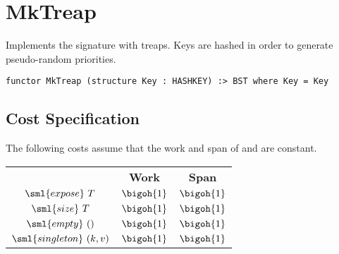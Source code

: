\chapter{MkTreap}
\label{ch:treap-bst}

\begin{cluster}
\label{grp:grm:treap-bst::implements}

\begin{gram}
\label{grm:treap-bst::implements}
\label{ch:treap-bst}
\begin{preamble}
Implements the  signature with treaps. Keys are hashed in order to
generate pseudo-random priorities.
\begin{verbatim}
functor MkTreap (structure Key : HASHKEY) :> BST where Key = Key
\end{verbatim}
\end{preamble}

\end{gram}
\end{cluster}


\section{Cost Specification}
\label{sec:treap-bst::cost-specification}

\begin{cluster}
\label{grp:grm:treap-bst::costs}

\begin{gram}
\label{grm:treap-bst::costs}
The following costs assume that the work and span of 
and  are constant.

\end{gram}
\end{cluster}

\begin{cluster}
\label{grp:cst:treap-bst::constant-work-operations}

\begin{costspec}
\label{cst:treap-bst::constant-work-operations}
\begin{tabular}{c|c|c}
& \textbf{Work} & \textbf{Span} \\
$\sml{expose}~T$ & $\bigoh{1}$ & $\bigoh{1}$ \\
$\sml{size}~T$ & $\bigoh{1}$ & $\bigoh{1}$ \\
$\sml{empty}~()$ & $\bigoh{1}$ & $\bigoh{1}$ \\
$\sml{singleton}~(k,v)$ & $\bigoh{1}$ & $\bigoh{1}$
\end{tabular}

\end{costspec}
\end{cluster}

